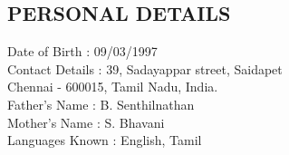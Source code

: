 \documentclass[margin, 10pt]{res} %
\begin{document}
\begin{resume}
\section{PERSONAL DETAILS}
Date of Birth \hspace{18pt} : 09/03/1997 \\
Contact Details \hspace{8pt} : 39, Sadayappar street, Saidapet\\
\hspace*{87pt} Chennai - 600015, Tamil Nadu, India.\\
Father’s Name \hspace{16pt} : B. Senthilnathan\\
Mother’s Name \hspace{13pt} : S. Bhavani\\
Languages Known \hspace{1pt}: English, Tamil\\

\end{resume}
\end{document}

